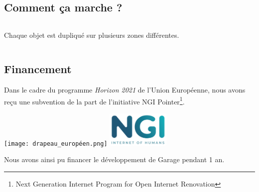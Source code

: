 \documentclass[11pt, aspectratio=1610]{beamer}
\begin{document}
\subsection{Comment ça marche ?}
\begin{frame}
\begin{columns}

\begin{center}
Chaque objet est dupliqué sur plusieurs zones différentes.\linebreak

\linebreak

\linebreak
\end{center}
\end{columns}
\end{frame}

\subsection{Financement}
\begin{frame}
\begin{center}
Dans le cadre du programme \textit{Horizon 2021} de l'Union Européenne, nous avons reçu une subvention de la part de l'initiative NGI Pointer\footnote[frame]{Next Generation Internet Program for Open Internet Renovation}.\linebreak

\texttt{[image: drapeau\_européen.png]}\hspace{1cm}
\includegraphics[width=3cm]{NGI.png}\linebreak

Nous avons ainsi pu financer le développement de Garage pendant 1 an.
\end{center}
\end{frame}
\end{document}
